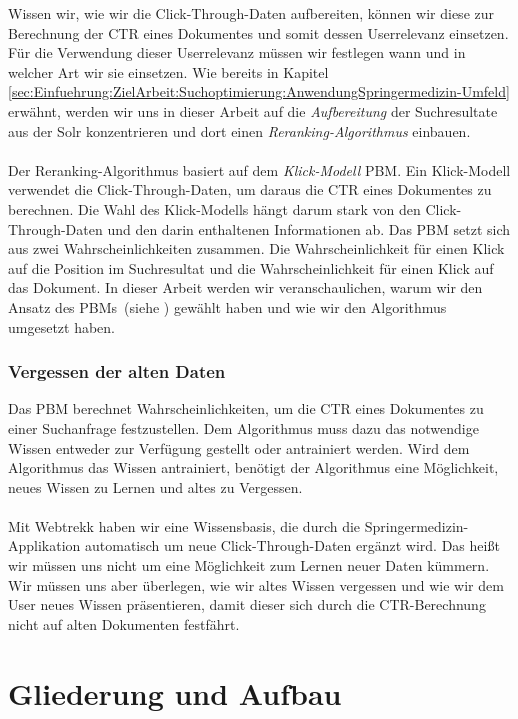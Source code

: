 Wissen wir, wie wir die Click-Through-Daten aufbereiten, können wir diese zur Berechnung der CTR eines Dokumentes und somit dessen Userrelevanz einsetzen. Für die Verwendung dieser Userrelevanz müssen wir festlegen wann und in welcher Art wir sie einsetzen. Wie bereits in Kapitel \ref{sec:Einfuehrung:ZielArbeit:Suchoptimierung:AnwendungSpringermedizin-Umfeld} erwähnt, werden wir uns in dieser Arbeit auf die \textit{Aufbereitung} der Suchresultate aus der Solr konzentrieren und dort einen \textit{Reranking-Algorithmus} einbauen. 
\\
\\
Der Reranking-Algorithmus basiert auf dem \textit{Klick-Modell} PBM. Ein Klick-Modell verwendet die Click-Through-Daten, um daraus die CTR eines Dokumentes zu berechnen. Die Wahl des Klick-Modells hängt darum stark von den Click-Through-Daten und den darin enthaltenen Informationen ab. Das PBM setzt sich aus zwei Wahrscheinlichkeiten zusammen. Die Wahrscheinlichkeit für einen Klick auf die Position im Suchresultat und die Wahrscheinlichkeit für einen Klick auf das Dokument. In dieser Arbeit werden wir veranschaulichen, warum wir den Ansatz des PBMs~(siehe \cite{pbm}) gewählt haben und wie wir den Algorithmus umgesetzt haben.

\subsubsection{Vergessen der alten Daten}
\label{sec:Einfuehrung:Vergessen}

Das PBM berechnet Wahrscheinlichkeiten, um die CTR eines Dokumentes zu einer Suchanfrage festzustellen. Dem Algorithmus muss dazu das notwendige Wissen entweder zur Verfügung gestellt oder antrainiert werden. Wird dem Algorithmus das Wissen antrainiert, benötigt der Algorithmus eine Möglichkeit, neues Wissen zu Lernen und altes zu Vergessen. 
\\
\\
Mit Webtrekk haben wir eine Wissensbasis, die durch die Springermedizin-Applikation automatisch um neue Click-Through-Daten ergänzt wird. Das heißt wir müssen uns nicht um eine Möglichkeit zum Lernen neuer Daten kümmern. Wir müssen uns aber überlegen, wie wir altes Wissen vergessen und wie wir dem User neues Wissen präsentieren, damit dieser sich durch die CTR-Berechnung nicht auf alten Dokumenten festfährt.


\section{Gliederung und Aufbau}
\label{sec:Einfuehrung:GliederungAufbau}

